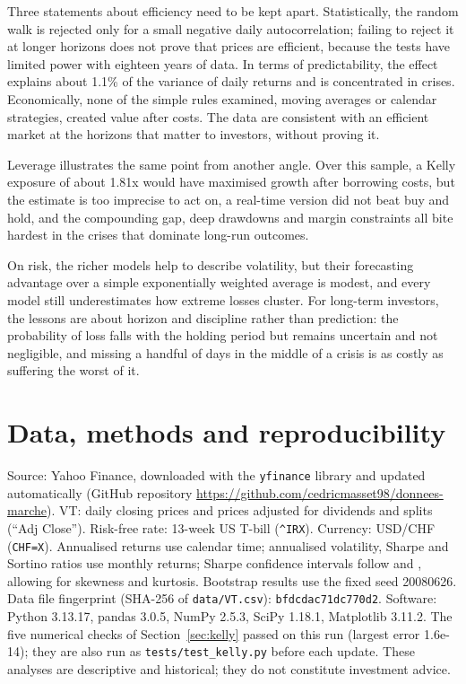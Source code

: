\documentclass[11pt,a4paper]{article}
\newcommand{\note}[1]{{\footnotesize\color{muted}#1\par}}
\begin{document}
Three statements about efficiency need to be kept apart. Statistically, the random walk is rejected only for a small negative daily autocorrelation; failing to reject it at longer horizons does not prove that prices are efficient, because the tests have limited power with eighteen years of data. In terms of predictability, the effect explains about 1.1\% of the variance of daily returns and is concentrated in crises. Economically, none of the simple rules examined, moving averages or calendar strategies, created value after costs. The data are consistent with an efficient market at the horizons that matter to investors, without proving it.

Leverage illustrates the same point from another angle. Over this sample, a Kelly exposure of about 1.81x would have maximised growth after borrowing costs, but the estimate is too imprecise to act on, a real-time version did not beat buy and hold, and the compounding gap, deep drawdowns and margin constraints all bite hardest in the crises that dominate long-run outcomes.

On risk, the richer models help to describe volatility, but their forecasting advantage over a simple exponentially weighted average is modest, and every model still underestimates how extreme losses cluster. For long-term investors, the lessons are about horizon and discipline rather than prediction: the probability of loss falls with the holding period but remains uncertain and not negligible, and missing a handful of days in the middle of a crisis is as costly as suffering the worst of it.

\section*{Data, methods and reproducibility}
\note{Source: Yahoo Finance, downloaded with the \texttt{yfinance} library and updated automatically (GitHub repository \url{https://github.com/cedricmasset98/donnees-marche}). VT: daily closing prices and prices adjusted for dividends and splits (``Adj Close''). Risk-free rate: 13-week US T-bill (\texttt{\^{}IRX}). Currency: USD/CHF (\texttt{CHF=X}). Annualised returns use calendar time; annualised volatility, Sharpe and Sortino ratios use monthly returns; Sharpe confidence intervals follow \citet{mertens2002} and \citet{opdyke2007}, allowing for skewness and kurtosis. Bootstrap results use the fixed seed 20080626. Data file fingerprint (SHA-256 of \texttt{data/VT.csv}): \texttt{bfdcdac71dc770d2}. Software: Python 3.13.17, pandas 3.0.5, NumPy 2.5.3, SciPy 1.18.1, Matplotlib 3.11.2. The five numerical checks of Section~\ref{sec:kelly} passed on this run (largest error 1.6e-14); they are also run as \texttt{tests/test\_kelly.py} before each update. These analyses are descriptive and historical; they do not constitute investment advice.}
\end{document}
